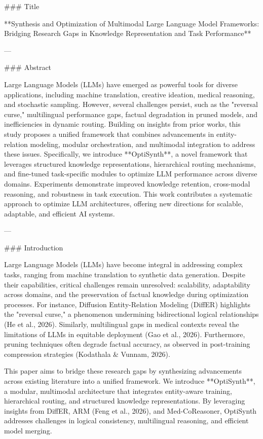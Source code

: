 ### Title

**Synthesis and Optimization of Multimodal Large Language Model Frameworks: Bridging Research Gaps in Knowledge Representation and Task Performance**

---

### Abstract

Large Language Models (LLMs) have emerged as powerful tools for diverse applications, including machine translation, creative ideation, medical reasoning, and stochastic sampling. However, several challenges persist, such as the "reversal curse," multilingual performance gaps, factual degradation in pruned models, and inefficiencies in dynamic routing. Building on insights from prior works, this study proposes a unified framework that combines advancements in entity-relation modeling, modular orchestration, and multimodal integration to address these issues. Specifically, we introduce **OptiSynth**, a novel framework that leverages structured knowledge representations, hierarchical routing mechanisms, and fine-tuned task-specific modules to optimize LLM performance across diverse domains. Experiments demonstrate improved knowledge retention, cross-modal reasoning, and robustness in task execution. This work contributes a systematic approach to optimize LLM architectures, offering new directions for scalable, adaptable, and efficient AI systems.

---

### Introduction

Large Language Models (LLMs) have become integral in addressing complex tasks, ranging from machine translation to synthetic data generation. Despite their capabilities, critical challenges remain unresolved: scalability, adaptability across domains, and the preservation of factual knowledge during optimization processes. For instance, Diffusion Entity-Relation Modeling (DiffER) highlights the "reversal curse," a phenomenon undermining bidirectional logical relationships (He et al., 2026). Similarly, multilingual gaps in medical contexts reveal the limitations of LLMs in equitable deployment (Gao et al., 2026). Furthermore, pruning techniques often degrade factual accuracy, as observed in post-training compression strategies (Kodathala & Vunnam, 2026).

This paper aims to bridge these research gaps by synthesizing advancements across existing literature into a unified framework. We introduce **OptiSynth**, a modular, multimodal architecture that integrates entity-aware training, hierarchical routing, and structured knowledge representations. By leveraging insights from DiffER, ARM (Feng et al., 2026), and Med-CoReasoner, OptiSynth addresses challenges in logical consistency, multilingual reasoning, and efficient model merging.

